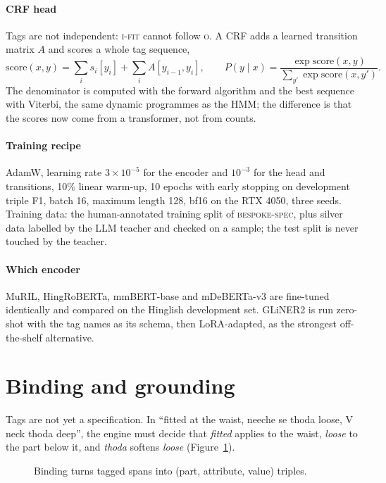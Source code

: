 \paragraph{CRF head} Tags are not independent: \textsc{i-fit} cannot follow \textsc{o}. A CRF adds a learned transition matrix $A$ and scores a whole tag sequence,
\begin{equation}
\mathrm{score}(x,y) = \sum_i s_i[y_i] + \sum_i A[y_{i-1},y_i], \qquad
P(y\mid x) = \frac{\exp \mathrm{score}(x,y)}{\sum_{y'} \exp\mathrm{score}(x,y')}.
\end{equation}
The denominator is computed with the forward algorithm and the best sequence with Viterbi, the same dynamic programmes as the HMM; the difference is that the scores now come from a transformer, not from counts.

\paragraph{Training recipe} AdamW, learning rate $3\times10^{-5}$ for the encoder and $10^{-3}$ for the head and transitions, 10\% linear warm-up, 10 epochs with early stopping on development triple F1, batch 16, maximum length 128, bf16 on the RTX 4050, three seeds. Training data: the human-annotated training split of \textsc{bespoke-spec}, plus silver data labelled by the LLM teacher and checked on a sample; the test split is never touched by the teacher.

\paragraph{Which encoder} MuRIL, HingRoBERTa, mmBERT-base and mDeBERTa-v3 are fine-tuned identically and compared on the Hinglish development set. GLiNER2 \cite{zaratiana2025gliner2} is run zero-shot with the tag names as its schema, then LoRA-adapted, as the strongest off-the-shelf alternative.

\section{Binding and grounding}

Tags are not yet a specification. In ``fitted at the waist, neeche se thoda loose, V neck thoda deep'', the engine must decide that \emph{fitted} applies to the waist, \emph{loose} to the part below it, and \emph{thoda} softens \emph{loose} (Figure~\ref{fig:binding}).

\begin{figure}[h]
\centering
\caption{Binding turns tagged spans into (part, attribute, value) triples.}\label{fig:binding}
\end{figure}

